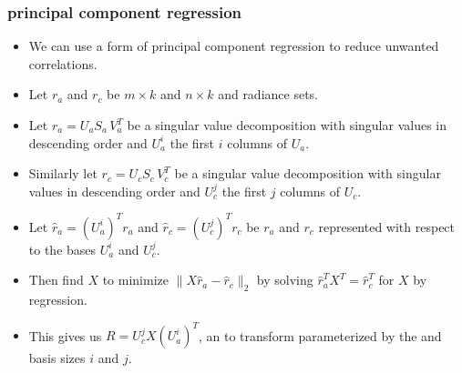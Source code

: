 \documentclass[10pt]{beamer}
\begin{document}
\begin{frame}
\frametitle{principal component regression}
\begin{itemize}

  \item We can use a form of principal component regression to
    reduce unwanted correlations.

  \item Let $r_a$ and $r_c$ be $m \times k$ and $n \times k$ {\airs}
    and {\cris} radiance sets.

  \item Let $r_a = U_a S_a\,V_a^T$ be a singular value decomposition
    with singular values in descending order and $U_a^i$ the first
    $i$ columns of $U_a$.

  \item Similarly let $r_c = U_c S_c\,V_c^T$ be a singular value
    decomposition with singular values in descending order and
    $U_c^j$ the first $j$ columns of $U_c$.

  \item Let $\hat r_a = (U_a^i)^T r_a$ and $\hat r_c = (U_c^j)^T
    r_c$ be $r_a$ and $r_c$ represented with respect to the bases
    $U_a^i$ and $U_c^j$.

  \item Then find $X$ to minimize $\|X \hat r_a - \hat r_c\|_2$ by
    solving $\hat r_a^T X^T = \hat r_c^T$ for $X$ by regression.

  \item This gives us $R = U_c^j X (U_a^i)^T$, an {\airs} to {\cris}
    transform parameterized by the {\airs} and {\cris} basis sizes
    $i$ and $j$.

\end{itemize}
\end{frame}
\end{document}
